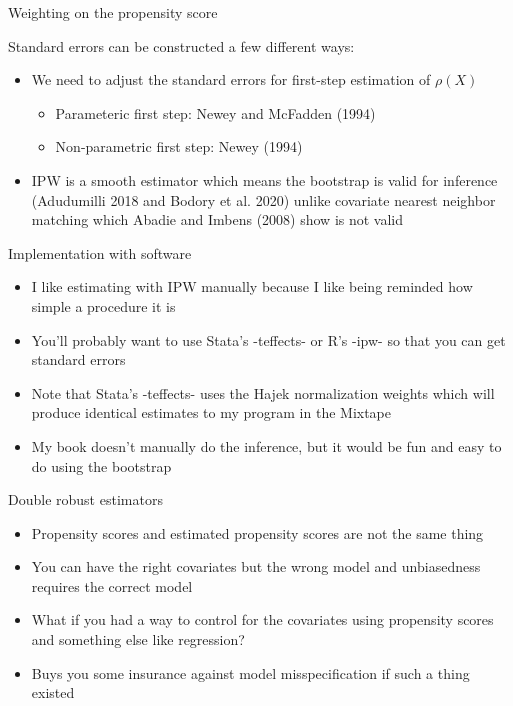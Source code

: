 \documentclass{beamer}
\begin{document}
\begin{frame}{Weighting on the propensity score}
	
		
Standard errors can be constructed a few different ways:
	\begin{itemize}
	\item We need to adjust the standard errors for first-step estimation of $\rho(X)$
		\begin{itemize}
		\item Parameteric first step: Newey and McFadden (1994)
		\item Non-parametric first step: Newey (1994)
		\end{itemize}
	\item IPW is a smooth estimator which means the bootstrap is valid for inference  (Adudumilli 2018 and Bodory et al. 2020) unlike covariate nearest neighbor matching which Abadie and Imbens (2008) show is not valid
	\end{itemize}
\end{frame}



\begin{frame}{Implementation with software}

\begin{itemize}
\item I like estimating with IPW manually because I like being reminded how simple a procedure it is
\item You'll probably want to use Stata's -teffects- or R's -ipw- so that you can get standard errors
\item Note that Stata's -teffects- uses the Hajek normalization weights which will produce identical estimates to my program in the Mixtape
\item My book doesn't manually do the inference, but it would be fun and easy to do using the bootstrap
\end{itemize}

\end{frame}

\begin{frame}{Double robust estimators}

\begin{itemize}
\item Propensity scores and estimated propensity scores are not the same thing
\item You can have the right covariates but the wrong model and unbiasedness requires the correct model
\item What if you had a way to control for the covariates using propensity scores and something else like regression?
\item Buys you some insurance against model misspecification if such a thing existed
\end{itemize}

\end{frame}
\end{document}

